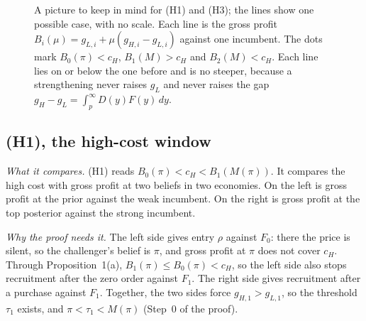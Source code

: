 \begin{figure}[ht]
\centering
{}
\caption{A picture to keep in mind for (H1) and (H3); the lines show one possible case, with no scale. Each
line is the gross profit \(B_i(\mu)=g_{L,i}+\mu(g_{H,i}-g_{L,i})\) against one incumbent. The dots mark
\(B_0(\pi)<c_H\), \(B_1(M)>c_H\) and \(B_2(M)<c_H\). Each line lies on or below the one before and is no steeper,
because a strengthening never raises \(g_L\) and never raises the gap \(g_H-g_L=\int_p^\infty D(y)F(y)\,dy\).}
\label{fig:ccc-profit}
\end{figure}

\subsection{(H1), the high-cost window}

\emph{What it compares.} (H1) reads \(B_0(\pi)<c_H<B_1(M(\pi))\). It compares the high cost with gross profit at
two beliefs in two economies. On the left is gross profit at the prior against the weak incumbent. On the right is
gross profit at the top posterior against the strong incumbent.

\emph{Why the proof needs it.} The left side gives entry \(\rho\) against \(F_0\): there the price is silent, so the
challenger's belief is \(\pi\), and gross profit at \(\pi\) does not cover \(c_H\). Through Proposition~1(a),
\(B_1(\pi)\le B_0(\pi)<c_H\), so the left side also stops recruitment after the zero order against \(F_1\). The right
side gives recruitment after a purchase against \(F_1\). Together, the two sides force \(g_{H,1}>g_{L,1}\), so the
threshold \(\tau_1\) exists, and \(\pi<\tau_1<M(\pi)\) (Step~0 of the proof).

